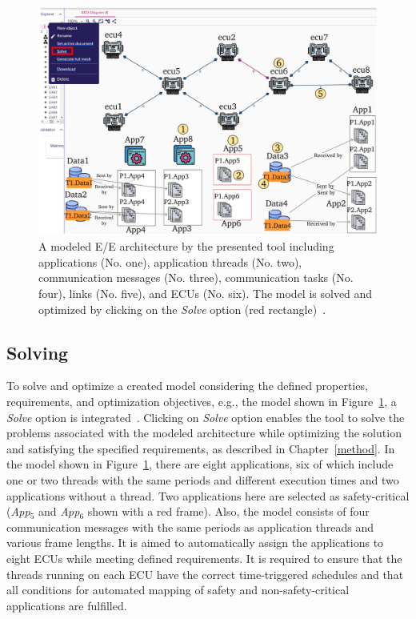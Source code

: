     
    \begin{figure}[t]
	\centering
	\includegraphics[width=1\textwidth]{figures/solved_model_new.pdf}
	\caption{A modeled E/E architecture by the presented tool including applications (No. one), application threads (No. two), communication messages (No. three), communication tasks (No. four), links (No. five), and ECUs (No. six). The model is solved and optimized by clicking on the \textit{Solve} option (red rectangle)~\cite{askaripoor2023designer}.}
	\label{fig7} 
    \end{figure}

    \subsection{Solving}
    
    To solve and optimize a created model considering the defined properties, requirements, and optimization objectives, e.g., the model shown in Figure~\ref{fig7}, a \textit{Solve} option is integrated~\cite{askaripoor2023designer}. Clicking on \textit{Solve} option enables the tool to solve the problems associated with the modeled architecture while optimizing the solution and satisfying the specified requirements, as described in Chapter~\ref{method}. In the model shown in Figure~\ref{fig7}, there are eight applications, six of which include one or two threads with the same periods and different execution times and two applications without a thread. Two applications here are selected as safety-critical (\textit{App$_{5}$} and \textit{App$_{6}$} shown with a red frame). Also, the model consists of four communication messages with the same periods as application threads and various frame lengths. It is aimed to automatically assign the applications to eight ECUs while meeting defined requirements. It is required to ensure that the threads running on each ECU have the correct time-triggered schedules and that all conditions for automated mapping of safety and non-safety-critical applications are fulfilled. 
    
